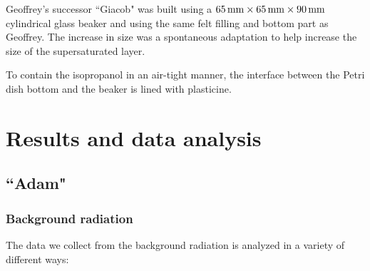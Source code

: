 \documentclass[10pt,a4paper]{article}
\begin{document}
Geoffrey's successor ``Giacob" was built using a $\qtyproduct{65 x 65 x 90}{\milli\meter}$ cylindrical glass beaker and using the same felt filling and bottom part as Geoffrey. The increase in size was a spontaneous adaptation to help increase the size of the supersaturated layer. 

To contain the isopropanol in an air-tight manner, the interface between the Petri dish bottom and the beaker is lined with plasticine.


\section{Results and data analysis}
\subsection{``Adam"}
\subsubsection{Background radiation}
The data we collect from the background radiation is analyzed in a variety of different ways:
\end{document}
